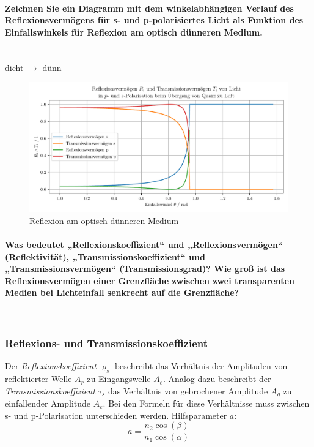 \documentclass[a4paper, 11pt, ngerman, parskip=half-]{scrartcl}
\begin{document}
\paragraph{Zeichnen Sie ein Diagramm mit dem winkelabhängigen Verlauf des Reflexionsvermögens für s- und p-polarisiertes Licht
    als Funktion des Einfallswinkels für Reflexion am optisch dünneren Medium.}~\\
%
dicht $\rightarrow$ dünn
%
\begin{figure}[H]
    \centering
    \begin{samepage}
        \includegraphics[width=\textwidth]{image/15/Quarz_zu_Luft.pdf}
        \caption{Reflexion am optisch dünneren Medium}
        \label{fig:reflexion_duenn}
    \end{samepage}
\end{figure}
%
\paragraph{Was bedeutet „Reflexionskoeffizient“ und „Reflexionsvermögen“ (Reflektivität), „Transmissionskoeffizient“ und „Transmissionsvermögen“ (Transmissionsgrad)? Wie groß ist das Reflexionsvermögen einer Grenzfläche zwischen zwei transparenten Medien bei Lichteinfall senkrecht auf die Grenzfläche?}~
%
\subsubsection*{Reflexions- und Transmissionskoeffizient}
%
Der \textit{Reflexionskoeffizient $\varrho_s$} beschreibt das Verhältnis der Amplituden von reflektierter Welle $A_r$
zu Eingangswelle $A_e$. Analog dazu beschreibt der \textit{Transmissionskoeffizient $\tau_s$} das Verhältnis von gebrochener
Amplitude $A_g$ zu einfallender Amplitude $A_e$. Bei den Formeln für diese Verhältnisse muss zwischen s- und p-Polarisation
unterschieden werden. Hilfsparameter $a$:
%
\[a = \frac{n_2 \cos(\beta)}{n_1 \cos(\alpha)}\]
\end{document}
